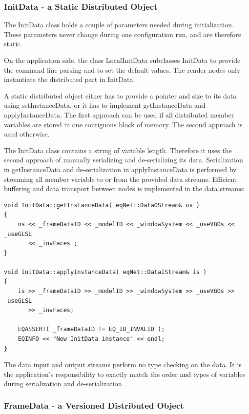 \documentclass[10pt,a4]{scrartcl}
\begin{document}
\subsubsection{\label{sInitData}InitData - a Static Distributed Object}

The \textsf{InitData} class holds a couple of parameters needed during
initialization. These parameters never change during one configuration
run, and are therefore static.

On the application side, the class \textsf{LocalInitData} subclasses
\textsf{InitData} to provide the command line parsing and to set the
default values. The render nodes only instantiate the distributed part
in \textsf{InitData}.

A static distributed object either has to provide a pointer and size to
its data using \textsf{setInstanceData}, or it has to implement
\textsf{getInstanceData} and \textsf{applyInstanceData}. The first
approach can be used if all distributed member variables are stored in
one contiguous block of memory. The second approach is used otherwise.

The \textsf{InitData} class contains a string of variable
length. Therefore it uses the second approach of manually serializing
and de-serializing its data. Serialization in \textsf{getInstanceData}
and de-serialization in \textsf{applyInstanceData} is performed by
streaming all member variable to or from the provided data
streams. Efficient buffering and data transport between nodes is
implemented in the data streams:

{\footnotesize\begin{lstlisting}
void InitData::getInstanceData( eqNet::DataOStream& os )
{
    os << _frameDataID << _modelID << _windowSystem << _useVBOs << _useGLSL
       << _invFaces ;
}

void InitData::applyInstanceData( eqNet::DataIStream& is )
{
    is >> _frameDataID >> _modelID >> _windowSystem >> _useVBOs >> _useGLSL
       >> _invFaces;

    EQASSERT( _frameDataID != EQ_ID_INVALID );
    EQINFO << "New InitData instance" << endl;
}
\end{lstlisting}}%

The data input and output streams perform no type checking on the data.
It is the application's responsibility to exactly match the order and
types of variables during serialization and de-serialization.

\subsubsection{FrameData - a Versioned Distributed Object}
\end{document}
